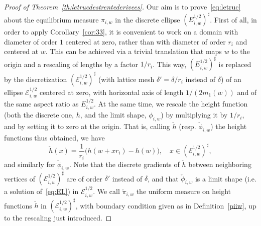 \documentclass[AHL,Unicode,longabstracts,published]{cedram}
\newcommand{\clE}{\mathcal{E}}
\renewcommand{\d}{{\sharp }}
\begin{document}
\begin{proof}[Proof of Theorem~\ref{th:letrucdestrentederivees}]
Our aim is to prove~\eqref{eq:letruc} about the equilibrium measure $\pi_{i,w}$ in the discrete ellipse $(E^{1/2}_{i,w})^\d$. First of all, in order to apply Corollary~\ref{cor:33}, it is convenient to work on a domain with diameter of order $1$ centered at zero, rather than with diameter of order $r_i$ and centered at $w$. This can be achieved via a trivial translation that maps $w$ to the origin and a rescaling of lengths by a factor $1/r_i$. This way, $(E^{1/2}_{i,w})^\d$ is replaced by the discretization $(\clE^{1/2}_{i,w})^{\d}$ (with lattice mesh $\delta'=\delta/r_i$ instead of $\delta$) of an ellipse $\clE_{i,w}^{1/2}$ centered at zero, with horizontal axis of length $1/(2m_1(w))$ and of the same aspect ratio as $E^{1/2}_{i,w}$. At the same time, we rescale the height function (both the discrete one, $h$, and the limit shape, $\phi_{i,w}$) by multiplying it by $1/r_i$, and by setting it to zero at the origin. That is, calling $\check h$ (resp. $\check
\phi_{i,w}$) the height functions thus obtained, we have
\begin{equation}
\check h(x)=\frac1{r_i}\big(h(w+xr_i)-h(w)\big), \quad x\in \left(\clE^{1/2}_{i,w}\right)^\d,
\end{equation}
and similarly for $\check \phi_{i,w}$. Note that the discrete gradients of $\check h$ between neighboring vertices of $(\clE^{1/2}_{i,w})^{\d}$ are of order $\delta'$ instead of $\delta$, and that $\check \phi_{i,w}$ is a limit shape (i.e. a solution of~\eqref{eq:EL}) in $\clE^{1/2}_{i,w}$. We call $\check\pi_{i,w}$ the uniform measure on height functions $\check h$ in $(\clE^{1/2}_{i,w})^{\d}$, with boundary condition given as in Definition~\ref{piiw}, up to the rescaling just introduced.


\end{proof}
\end{document}
